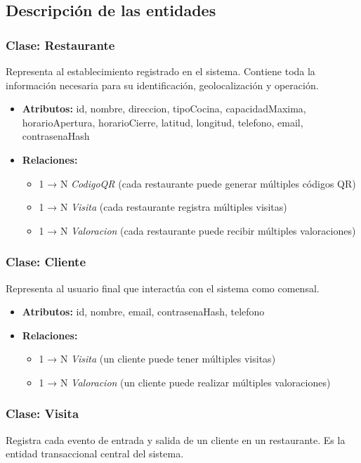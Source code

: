 \subsection{Descripción de las entidades}

\subsubsection{Clase: Restaurante}
Representa al establecimiento registrado en el sistema. Contiene toda la información necesaria para su identificación, geolocalización y operación.

\begin{itemize}
    \item \textbf{Atributos:} id, nombre, direccion, tipoCocina, capacidadMaxima, horarioApertura, horarioCierre, latitud, longitud, telefono, email, contrasenaHash
    \item \textbf{Relaciones:}
    \begin{itemize}
        \item 1 → N \textit{CodigoQR} (cada restaurante puede generar múltiples códigos QR)
        \item 1 → N \textit{Visita} (cada restaurante registra múltiples visitas)
        \item 1 → N \textit{Valoracion} (cada restaurante puede recibir múltiples valoraciones)
    \end{itemize}
\end{itemize}

\subsubsection{Clase: Cliente}
Representa al usuario final que interactúa con el sistema como comensal.

\begin{itemize}
    \item \textbf{Atributos:} id, nombre, email, contrasenaHash, telefono
    \item \textbf{Relaciones:}
    \begin{itemize}
        \item 1 → N \textit{Visita} (un cliente puede tener múltiples visitas)
        \item 1 → N \textit{Valoracion} (un cliente puede realizar múltiples valoraciones)
    \end{itemize}
\end{itemize}

\subsubsection{Clase: Visita}
Registra cada evento de entrada y salida de un cliente en un restaurante. Es la entidad transaccional central del sistema.

